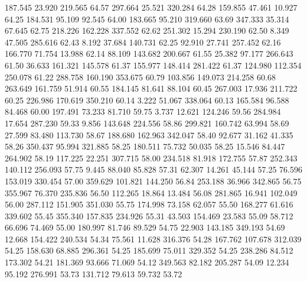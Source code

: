  187.545   23.920  219.565        64.57
 297.664   25.521  320.284        64.28
 159.855   47.461   10.927        64.25
 184.531   95.109   92.545        64.00
 183.665   95.210  319.660        63.69
 347.333   35.314   67.645        62.75
 218.226  162.228  337.552        62.62
 251.302   15.294  230.190        62.50
   8.349   47.505  285.616        62.43
   8.192   37.684  140.731        62.25
  92.910   27.741  257.452        62.16
 166.770   71.754   13.988        62.14
  88.109  143.682  200.667        61.55
  25.382   97.177  266.643        61.50
  36.633  161.321  145.578        61.37
 155.977  148.414  281.422        61.37
 124.980  112.354  250.078        61.22
 288.758  160.190  353.675        60.79
 103.856  149.073  214.258        60.68
 263.649  161.759   51.914        60.55
 184.145   81.641   88.104        60.45
 267.003   17.936  211.722        60.25
 226.986  170.619  350.210        60.14
   3.222   51.067  338.064        60.13
 165.584   96.588   84.468        60.00
 197.491   73.233   81.710        59.75
   3.737   12.621  124.246        59.56
 284.984   17.654  287.230        59.33
   9.856  143.648  224.556        58.86
 299.821  160.742   63.994        58.69
  27.599   83.480  113.730        58.67
 188.680  162.963  342.047        58.40
  92.677   31.162   41.335        58.26
 350.437   95.994  321.885        58.25
 180.511   75.732   50.035        58.25
  15.546   84.447  264.902        58.19
 117.225   22.251  307.715        58.00
 234.518   81.918  172.755        57.87
 252.343  140.112  256.093        57.75
   9.445   88.040   85.828        57.31
  62.307   14.261   45.144        57.25
  76.596  153.019  330.454        57.00
 359.629  101.821  144.250        56.84
 253.188   36.966  342.865        56.75
 355.967   76.370  235.836        56.50
 112.265   18.864   13.484        56.08
 281.865   16.941  102.049        56.00
 287.112  151.905  351.030        55.75
 174.998   73.158   62.057        55.50
 168.277   61.616  339.602        55.45
 355.340  157.835  234.926        55.31
  43.503  154.469   23.583        55.09
  58.712   66.696   74.469        55.00
 180.997   81.746   89.529        54.75
  22.903  143.185  349.193        54.69
  12.668  154.422  240.534        54.34
  75.561   11.628  316.376        54.28
 167.762  107.678  312.039        54.25
 158.630   68.885  296.361        54.25
 185.699   75.011  329.352        54.25
 238.286   84.512  173.302        54.21
 181.369   93.666   71.069        54.12
 349.563   82.182  205.287        54.09
  12.234   95.192  276.991        53.73
 131.712   79.613   59.732        53.72
